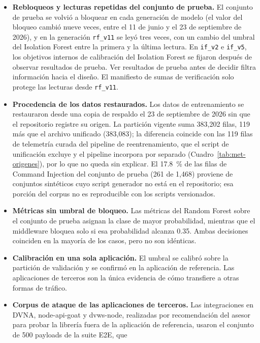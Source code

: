 \begin{itemize}
    \item \textbf{Rebloqueos y lecturas repetidas del conjunto de prueba.} El conjunto de prueba
    se volvió a bloquear en cada generación de modelo (el valor del bloqueo cambió nueve veces, entre
    el 11 de junio y el 23 de septiembre de 2026), y en la generación
    \texttt{rf\_v11} se leyó tres veces, con un cambio del umbral del Isolation Forest entre la
    primera y la última lectura. En \texttt{if\_v2} e \texttt{if\_v5}, los objetivos internos de
    calibración del Isolation Forest se fijaron después de observar resultados de prueba. Ver
    resultados de prueba antes de decidir filtra información hacia el diseño. El manifiesto de
    sumas de verificación solo protege las lecturas desde \texttt{rf\_v11}.
    \item \textbf{Procedencia de los datos restaurados.} Los datos de entrenamiento se
    restauraron desde una copia de respaldo el 23 de septiembre de 2026 sin que el repositorio
    registre su origen. La partición vigente suma 383{,}202 filas, 119 más que el archivo
    unificado (383{,}083); la diferencia coincide con las 119 filas de telemetría curada del
    pipeline de reentrenamiento, que el script de unificación excluye y el pipeline incorpora por
    separado (Cuadro~\ref{tab:met-origenes}), por lo que no queda sin explicar. El 17.8~\%
    de las filas de Command Injection del conjunto de prueba (261 de 1{,}468) proviene de
    conjuntos sintéticos cuyo script generador no está en el repositorio; esa porción del corpus no
    es reproducible con los scripts versionados.
    \item \textbf{Métricas sin umbral de bloqueo.} Las métricas del Random Forest sobre el
    conjunto de prueba asignan la clase de mayor probabilidad, mientras que el middleware bloquea
    solo si esa probabilidad alcanza 0.35. Ambas decisiones coinciden en la mayoría de los casos,
    pero no son idénticas.
    \item \textbf{Calibración en una sola aplicación.} El umbral se calibró sobre la partición
    de validación y se confirmó en la aplicación de referencia. Las aplicaciones de terceros son
    la única evidencia de cómo transfiere a otras formas de tráfico.
    \item \textbf{Corpus de ataque de las aplicaciones de terceros.} Las integraciones en DVNA,
    node-api-goat y dvws-node, realizadas por recomendación del asesor para probar la librería
    fuera de la aplicación de referencia, usaron el conjunto de 500 payloads de la suite E2E, que

\end{itemize}
